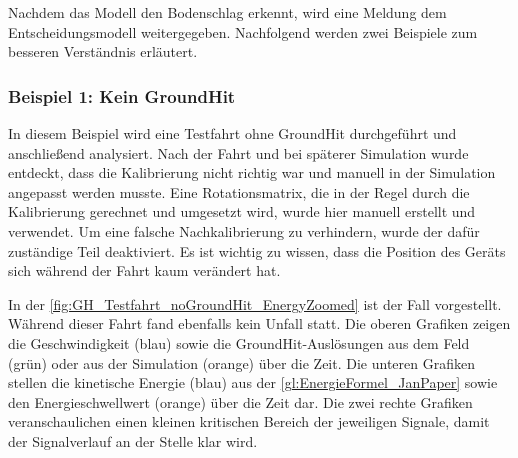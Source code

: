 Nachdem das Modell den Bodenschlag erkennt, wird eine Meldung dem Entscheidungsmodell weitergegeben. Nachfolgend werden zwei Beispiele zum besseren Verständnis erläutert.

\subsubsection{Beispiel 1: Kein GroundHit}
In diesem Beispiel wird eine Testfahrt ohne GroundHit durchgeführt und anschließend analysiert. Nach der Fahrt und bei späterer Simulation wurde entdeckt, dass die Kalibrierung nicht richtig war und manuell in der Simulation angepasst werden musste. Eine Rotationsmatrix, die in der Regel durch die Kalibrierung gerechnet und umgesetzt wird, wurde hier manuell erstellt und verwendet. Um eine falsche Nachkalibrierung zu verhindern, wurde der dafür zuständige Teil deaktiviert. Es ist wichtig zu wissen, dass die Position des Geräts sich während der Fahrt kaum verändert hat.



In der \autoref{fig:GH_Testfahrt_noGroundHit_EnergyZoomed} ist der Fall vorgestellt. Während dieser Fahrt fand ebenfalls kein Unfall statt. 
Die oberen Grafiken zeigen die Geschwindigkeit (blau) sowie die GroundHit-Auslösungen aus dem Feld (grün) oder aus der Simulation (orange) über die Zeit.
Die unteren Grafiken stellen die kinetische Energie (blau) aus der \autoref{gl:EnergieFormel_JanPaper} sowie den Energieschwellwert (orange) über die Zeit dar.
Die zwei rechte Grafiken veranschaulichen einen kleinen kritischen Bereich der jeweiligen Signale, damit der Signalverlauf an der Stelle klar wird.


